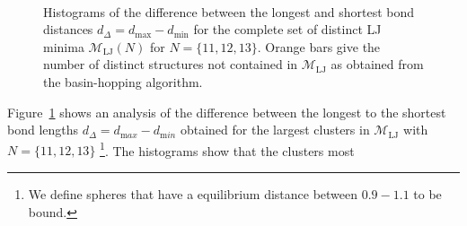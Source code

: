 \begin{figure}
    \centering
    \\
    \caption{Histograms of the difference between the longest and shortest bond
    distances $d_\Delta=d_\text{max}-d_\text{min}$ for the complete set of
    distinct LJ minima $\mathcal{M}_\text{LJ}(N)$ for $N=\{11,12,13\}$. Orange
    bars give the number of distinct structures not contained in
    $\mathcal{M}_\mathrm{LJ}$ as obtained from the basin-hopping algorithm.}
    \label{fig:bondlength-variance}
\end{figure}%
%
%
Figure~\ref{fig:bondlength-variance} shows an analysis of the difference
between the longest to the shortest bond lengths $d_\Delta=d_{\mathrm max}-d_{\mathrm
min}$ obtained for the largest clusters in $\mathcal{M}_{\mathrm{LJ}}$ with
$N=\{11,12,13\}$ \footnote{We define spheres that have a equilibrium distance
between $0.9-1.1$ to be bound.}.  The histograms show that the clusters most
